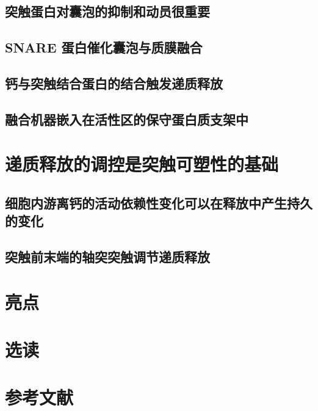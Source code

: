 \subsection{突触蛋白对囊泡的抑制和动员很重要}
\subsection{SNARE 蛋白催化囊泡与质膜融合}
\subsection{钙与突触结合蛋白的结合触发递质释放}
\subsection{融合机器嵌入在活性区的保守蛋白质支架中}

\section{递质释放的调控是突触可塑性的基础}
\subsection{细胞内游离钙的活动依赖性变化可以在释放中产生持久的变化}
\subsection{突触前末端的轴突突触调节递质释放}

\section{亮点}

\section{选读}

\section{参考文献}

